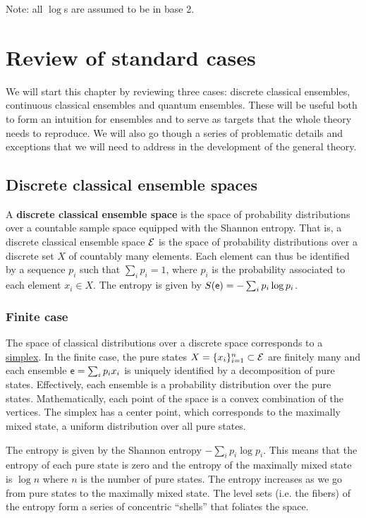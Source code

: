 Note: all $\log$s are assumed to be in base 2.

\section{Review of standard cases}

We will start this chapter by reviewing three cases: discrete classical ensembles, continuous classical ensembles and quantum ensembles. These will be useful both to form an intuition for ensembles and to serve as targets that the whole theory needs to reproduce. We will also go though a series of problematic details and exceptions that we will need to address in the development of the general theory.

\subsection{Discrete classical ensemble spaces}

\begin{defn}
	A \textbf{discrete classical ensemble space} is the space of probability distributions over a countable sample space equipped with the Shannon entropy. That is, a discrete classical ensemble space $\mathcal{E}$ is the space of probability distributions over a discrete set $X$ of countably many elements. Each element can thus be identified by a sequence $p_i$ such that $\sum_i p_i = 1$, where $p_i$ is the probability associated to each element $x_i \in X$. The entropy is given by $S(\mathsf{e}) = - \sum_i p_i \log p_i$.
\end{defn}

\subsubsection{Finite case}

The space of classical distributions over a discrete space corresponds to a \href{https://en.wikipedia.org/wiki/Simplex}{simplex}. In the finite case, the pure states $X = \{x_i\}_{i=1}^{n} \subset \mathcal{E}$ are finitely many and each ensemble $\mathsf{e} = \sum_i p_i x_i$ is uniquely identified by a decomposition of pure states. Effectively, each ensemble is a probability distribution over the pure states. Mathematically, each point of the space is a convex combination of the vertices. The simplex has a center point, which corresponds to the maximally mixed state, a uniform distribution over all pure states. 

The entropy is given by the Shannon entropy $-\sum_i p_i \log p_i$. This means that the entropy of each pure state is zero and the entropy of the maximally mixed state is $\log n$ where $n$ is the number of pure states. The entropy increases as we go from pure states to the maximally mixed state. The level sets (i.e. the fibers) of the entropy form a series of concentric ``shells'' that foliates the space.

